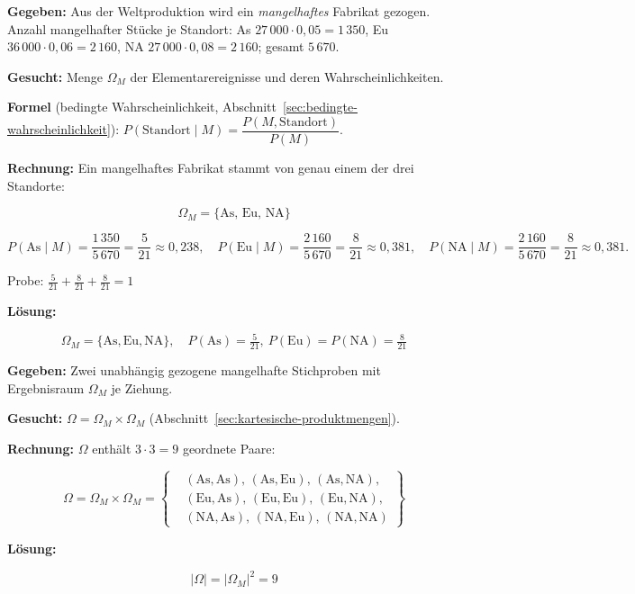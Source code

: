 \begin{beispiel}

\textbf{Gegeben:} Aus der Weltproduktion wird ein \emph{mangelhaftes} Fabrikat gezogen.
Anzahl mangelhafter Stücke je Standort:
As $27\,000\cdot 0{,}05 = 1\,350$, Eu $36\,000\cdot 0{,}06 = 2\,160$,
NA $27\,000\cdot 0{,}08 = 2\,160$; gesamt $5\,670$.

\textbf{Gesucht:} Menge $\Omega_M$ der Elementarereignisse und deren Wahrscheinlichkeiten.

\textbf{Formel} (bedingte Wahrscheinlichkeit, Abschnitt~\ref{sec:bedingte-wahrscheinlichkeit}):
$P(\text{Standort}\mid M) = \dfrac{P(M,\text{Standort})}{P(M)}$.

\textbf{Rechnung:} Ein mangelhaftes Fabrikat stammt von genau einem der drei Standorte:

$$
\Omega_M = \{\text{As},\,\text{Eu},\,\text{NA}\}
$$

$$
P(\text{As}\mid M) = \frac{1\,350}{5\,670} = \frac{5}{21} \approx 0{,}238,\quad
P(\text{Eu}\mid M) = \frac{2\,160}{5\,670} = \frac{8}{21} \approx 0{,}381,\quad
P(\text{NA}\mid M) = \frac{2\,160}{5\,670} = \frac{8}{21} \approx 0{,}381.
$$

Probe: $\tfrac{5}{21}+\tfrac{8}{21}+\tfrac{8}{21} = 1$ \checkmark

\textbf{Lösung:}

$$
\boxed{
\Omega_M = \{\text{As},\text{Eu},\text{NA}\},\quad
P(\text{As})=\tfrac{5}{21},\ P(\text{Eu})=P(\text{NA})=\tfrac{8}{21}
}
$$

\end{beispiel}

\begin{beispiel}

\textbf{Gegeben:} Zwei unabhängig gezogene mangelhafte Stichproben mit Ergebnisraum
$\Omega_M$ je Ziehung.

\textbf{Gesucht:} $\Omega = \Omega_M\times\Omega_M$
(Abschnitt~\ref{sec:kartesische-produktmengen}).

\textbf{Rechnung:} $\Omega$ enthält $3\cdot 3 = 9$ geordnete Paare:

$$
\Omega = \Omega_M\times\Omega_M = \left\{
\begin{aligned}
&(\text{As},\text{As}),\,(\text{As},\text{Eu}),\,(\text{As},\text{NA}),\\
&(\text{Eu},\text{As}),\,(\text{Eu},\text{Eu}),\,(\text{Eu},\text{NA}),\\
&(\text{NA},\text{As}),\,(\text{NA},\text{Eu}),\,(\text{NA},\text{NA})
\end{aligned}
\right\}
$$

\textbf{Lösung:}

$$
\boxed{|\Omega| = |\Omega_M|^{2} = 9}
$$

\end{beispiel}

